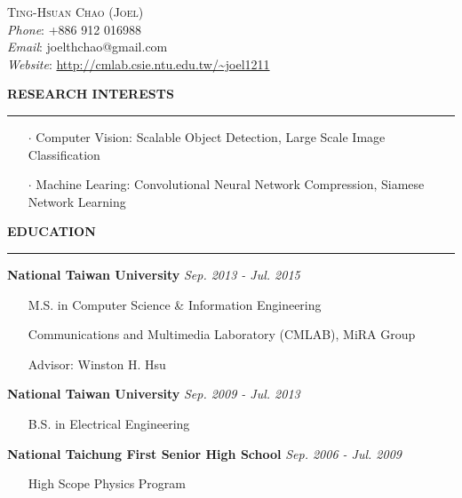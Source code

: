 \documentclass[11pt,letterpaper]{article}
\begin{document}
\begin{center} 
	{\huge \textsc{Ting-Hsuan Chao (Joel)}}\\
	{\em Phone}: +886 912 016988\\
	{\em Email}: joelthchao@gmail.com\\
	{\em Website}: \url{http://cmlab.csie.ntu.edu.tw/~joel1211}\\
\end{center}
\vspace{1em}


%
%

\noindent
\MakeUppercase{\bf Research Interests}
\vspace{0.5em}
\hrule

\begin{itemize}
	\itemsep=-0.5em
	\item[$\cdot$] Computer Vision: Scalable Object Detection, Large Scale Image Classification
	\item[$\cdot$] Machine Learing: Convolutional Neural Network Compression, Siamese Network Learning
\end{itemize}


%
%

\vspace{1em}
\noindent
\MakeUppercase{\bf Education}
\vspace{0.5em}
\hrule

%
\hspace{1.2em}
{\bf National Taiwan University} \hfill {\em Sep. 2013 - Jul. 2015}
\vspace{-0.5em}
\begin{itemize}[leftmargin=1.5em]
	\itemsep=-0.5em
	\item[] M.S. in Computer Science \& Information Engineering
	\item[] Communications and Multimedia Laboratory (CMLAB), MiRA Group
	\item[] Advisor: Winston H. Hsu
\end{itemize}

%
\noindent \hspace{1.2em}
{\bf National Taiwan University} \hfill {\em Sep. 2009 - Jul. 2013}
\vspace{-0.5em}
\begin{itemize}[leftmargin=1.5em]
	\itemsep=-0.5em
	\item[] B.S. in Electrical Engineering
\end{itemize}

%
\noindent \hspace{1.2em}
{\bf National Taichung First Senior High School} \hfill {\em Sep. 2006 - Jul. 2009}
\vspace{-0.5em}
\begin{itemize}[leftmargin=1.5em]
	\itemsep=-0.5em
	\item[] High Scope Physics Program
\end{itemize}
\end{document}
